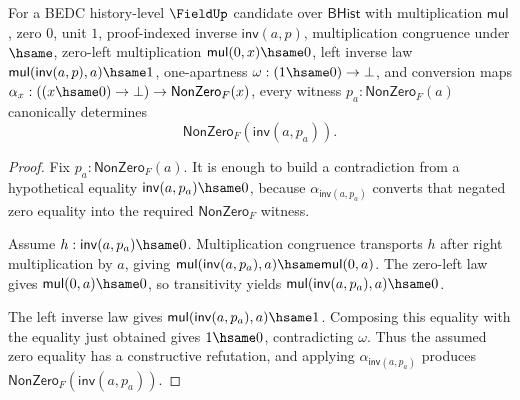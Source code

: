 \begin{theorem}
\label{thm:field-inverse-nonzero-from-one-apartness}
For a BEDC history-level $\FieldUp$ candidate over $\mathsf{BHist}$ with
multiplication $\mathsf{mul}$, zero $0$, unit $1$, proof-indexed inverse
$\mathsf{inv}(a,p)$, multiplication congruence under $\hsame$, zero-left
multiplication $\mathsf{mul}(0,x)\hsame 0$, left inverse law
$\mathsf{mul}(\mathsf{inv}(a,p),a)\hsame 1$, one-apartness
$\omega:(1\hsame 0)\to\bot$, and conversion maps
$\alpha_x:((x\hsame 0)\to\bot)\to\mathsf{NonZero}_F(x)$, every witness
$p_a:\mathsf{NonZero}_F(a)$ canonically determines
$$
\mathsf{NonZero}_F(\mathsf{inv}(a,p_a)).
$$
\end{theorem}
\begin{proof}
Fix $p_a:\mathsf{NonZero}_F(a)$. It is enough to build a contradiction
from a hypothetical equality $\mathsf{inv}(a,p_a)\hsame 0$, because
$\alpha_{\mathsf{inv}(a,p_a)}$ converts that negated zero equality into
the required $\mathsf{NonZero}_F$ witness.

Assume $h:\mathsf{inv}(a,p_a)\hsame 0$. Multiplication congruence transports
$h$ after right multiplication by $a$, giving
$\mathsf{mul}(\mathsf{inv}(a,p_a),a)\hsame\mathsf{mul}(0,a)$. The zero-left
law gives $\mathsf{mul}(0,a)\hsame 0$, so transitivity yields
$\mathsf{mul}(\mathsf{inv}(a,p_a),a)\hsame 0$.

The left inverse law gives
$\mathsf{mul}(\mathsf{inv}(a,p_a),a)\hsame 1$. Composing this equality with
the equality just obtained gives $1\hsame 0$, contradicting $\omega$. Thus
the assumed zero equality has a constructive refutation, and applying
$\alpha_{\mathsf{inv}(a,p_a)}$ produces
$\mathsf{NonZero}_F(\mathsf{inv}(a,p_a))$.
\end{proof}

